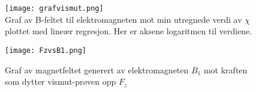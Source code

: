 \documentclass[norsk,a4paper,12pt]{article}
\begin{document}
 \begin{figure}
 	\begin{minipage}{\linewidth}
		\begin{center}
  		\texttt{[image: grafvismut.png]}\\
		\caption[Graf av B-feltet til elektromagneten mot min utregnede $\chi$]{Graf av B-feltet til elektromagneten mot min utregnede verdi av $\chi$ plottet med lineær regresjon. Her er aksene logaritmen til verdiene.}
		\label{vismutgraf}
		\end{center}
	\end{minipage}
	\hspace{.5cm}
 	\begin{minipage}{\linewidth}
		\begin{center}
  		\texttt{[image: FzvsB1.png]}\\
		\caption[Graf av B-feltet til elektromagneten mot kraften $F_z$]{Graf av magnetfeltet generert av elektromagneten $B_1$ mot kraften som dytter vismut-prøven opp $F_z$}
		\label{FzvsB1}
		\end{center}
	\end{minipage}
\end{figure}
\end{document}
